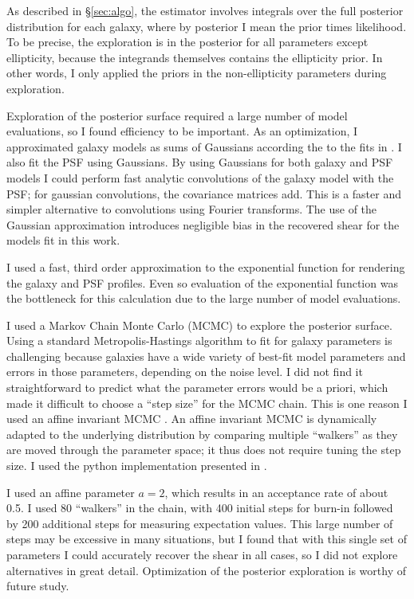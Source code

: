 \documentclass[12pt,preprint]{aastex}
\begin{document}
As described in \S \ref{sec:algo}, the estimator involves integrals over the
full posterior distribution for each galaxy, where by posterior I mean the
prior times likelihood.  To be precise, the exploration is in the posterior for
all parameters except ellipticity, because the integrands themselves contains
the ellipticity prior. In other words, I only applied the priors in the
non-ellipticity parameters during exploration.

Exploration of the posterior surface required a large number of model
evaluations, so I found efficiency to be important.  As an optimization, I
approximated galaxy models as sums of Gaussians according the to the fits in
\citet{HoggGMix}.  I also fit the PSF using Gaussians.  By using Gaussians for
both galaxy and PSF models I could perform fast analytic convolutions of the
galaxy model with the PSF; for gaussian convolutions, the covariance matrices
add.  This is a faster and simpler alternative to convolutions using Fourier
transforms. The use of the Gaussian approximation introduces negligible bias in
the recovered shear for the models fit in this work.

I used a fast, third order approximation to the exponential function for
rendering the galaxy and PSF profiles.  Even so evaluation of the exponential
function was the bottleneck for this calculation due to the large number
of model evaluations.

I used a Markov Chain Monte Carlo (MCMC) to explore the posterior surface.
Using a standard Metropolis-Hastings algorithm \citep{Metropolis53}  to fit for
galaxy parameters is challenging because galaxies have a wide variety of
best-fit model parameters and errors in those parameters, depending on the
noise level.  I did not find it straightforward to predict what the parameter
errors would be a priori, which made it difficult to choose a ``step size'' for
the MCMC chain.  This is one reason I used an affine invariant MCMC
\citet{GoodmanWeare10}.  An affine invariant MCMC is dynamically adapted to the
underlying distribution by comparing multiple ``walkers'' as they are moved
through the parameter space; it thus does not require tuning the step size.  I
used the python implementation presented in \citet{Mackey13}.

I used an affine parameter $a=2$, which results in an acceptance rate of about
0.5. I used 80 ``walkers'' in the chain, with 400 initial steps for burn-in
followed by 200 additional steps for measuring expectation values.  This large
number of steps may be excessive in many situations, but I found that with this
single set of parameters I could accurately recover the shear in all cases, so
I did not explore alternatives in great detail.  Optimization of the posterior
exploration is worthy of future study.
\end{document}
